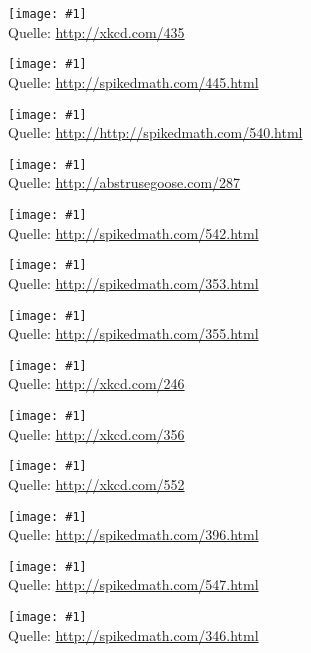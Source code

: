 \documentclass[a4paper,ngerman,landscape]{scrartcl}
\newcommand{\comic}[3]{\begin{center}
  \texttt{[image: \#1]} \\[2em]

  Quelle: \url{#2}
\end{center}\newpage}
\begin{document}
\comic{purity.png}{http://xkcd.com/435}{0.8}
\comic{three-logicians.png}{http://spikedmath.com/445.html}{1.4}
\comic{540-adventures-of-martin.png}{http://http://spikedmath.com/540.html}{1.4}
\comic{this_is_what_my_room_looks_like_when_i_draw}{http://abstrusegoose.com/287}{0.4}
\comic{542-science-vs-math}{http://spikedmath.com/542.html}{1.4}
\comic{353-fortune-teller-1}{http://spikedmath.com/353.html}{1.4}
\comic{355-fortune-teller-3}{http://spikedmath.com/355.html}{1.4}
\comic{labyrinth_puzzle}{http://xkcd.com/246}{2.7}
\comic{nerd_sniping}{http://xkcd.com/356}{0.8}
\comic{correlation}{http://xkcd.com/552}{1.6}
\comic{homer}{http://spikedmath.com/396.html}{2.4}
\comic{547-the-perfect-score}{http://spikedmath.com/547.html}{1.3}
\comic{346-cookies}{http://spikedmath.com/346.html}{1.3}
\end{document}
